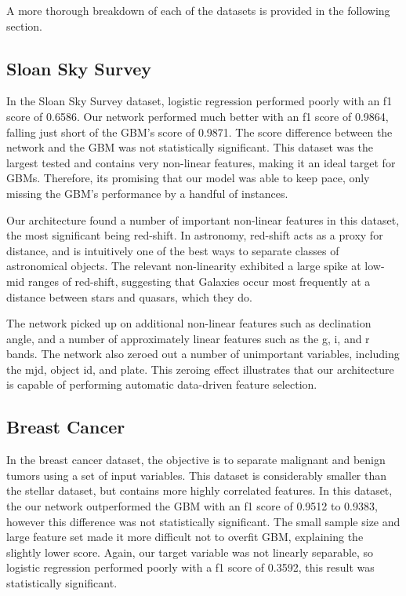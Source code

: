 A more thorough breakdown of each of the datasets is provided in the following section. 

\subsection{Sloan Sky Survey}

In the Sloan Sky Survey dataset, logistic regression performed poorly with an f1 score of 0.6586. Our network performed much better with an f1 score of 0.9864, falling just short of the GBM’s score of 0.9871. The score difference between the network and the GBM was not statistically significant. This dataset was the largest tested and contains very non-linear features, making it an ideal target for GBMs.  Therefore, its promising that our model was able to keep pace, only missing the GBM's performance by a handful of instances. 

Our architecture found a number of important non-linear features in this dataset, the most significant being red-shift. In astronomy, red-shift acts as a proxy for distance, and is intuitively one of the best ways to separate classes of astronomical objects. The relevant non-linearity exhibited a large spike at low-mid ranges of red-shift, suggesting that Galaxies occur most frequently at a distance between stars and quasars, which they do.

The network picked up on additional non-linear features such as declination angle, and a number of approximately linear features such as the g, i, and r bands. The network also zeroed out a number of unimportant variables, including the mjd, object id, and plate. This zeroing effect illustrates that our architecture is capable of performing automatic data-driven feature selection.

\subsection{Breast Cancer}

In the breast cancer dataset, the objective is to separate malignant and benign tumors using a set of input variables. This dataset is considerably smaller than the stellar dataset, but contains more highly correlated features. In this dataset, the our network outperformed the GBM with an f1 score of 0.9512 to 0.9383, however this difference was not statistically significant. The small sample size and large feature set made it more difficult not to overfit GBM, explaining the slightly lower score. Again, our target variable was not linearly separable, so logistic regression performed poorly with a f1 score of 0.3592, this result was statistically significant. 

